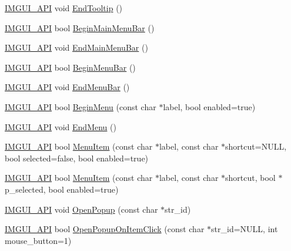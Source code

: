 \begin{DoxyCompactItemize}
\mbox{\hyperlink{imgui_8h_a43829975e84e45d1149597467a14bbf5}{I\+M\+G\+U\+I\+\_\+\+A\+PI}} void \mbox{\hyperlink{namespace_im_gui_ac8d75c160cfdf43d512f773ca133a1c6}{End\+Tooltip}} ()
\item 
\mbox{\hyperlink{imgui_8h_a43829975e84e45d1149597467a14bbf5}{I\+M\+G\+U\+I\+\_\+\+A\+PI}} bool \mbox{\hyperlink{namespace_im_gui_a55cb9cfb9865204ac6fb21c965784f78}{Begin\+Main\+Menu\+Bar}} ()
\item 
\mbox{\hyperlink{imgui_8h_a43829975e84e45d1149597467a14bbf5}{I\+M\+G\+U\+I\+\_\+\+A\+PI}} void \mbox{\hyperlink{namespace_im_gui_ab92f330c808546b340eb7bdf7e5f7c95}{End\+Main\+Menu\+Bar}} ()
\item 
\mbox{\hyperlink{imgui_8h_a43829975e84e45d1149597467a14bbf5}{I\+M\+G\+U\+I\+\_\+\+A\+PI}} bool \mbox{\hyperlink{namespace_im_gui_a4852dff802922163fc747e2e0df5b88f}{Begin\+Menu\+Bar}} ()
\item 
\mbox{\hyperlink{imgui_8h_a43829975e84e45d1149597467a14bbf5}{I\+M\+G\+U\+I\+\_\+\+A\+PI}} void \mbox{\hyperlink{namespace_im_gui_aa226265c140eb6ee375c5b9abc69c4fc}{End\+Menu\+Bar}} ()
\item 
\mbox{\hyperlink{imgui_8h_a43829975e84e45d1149597467a14bbf5}{I\+M\+G\+U\+I\+\_\+\+A\+PI}} bool \mbox{\hyperlink{namespace_im_gui_a1e55711a21f97d5dff919d697d3a7201}{Begin\+Menu}} (const char $\ast$label, bool enabled=true)
\item 
\mbox{\hyperlink{imgui_8h_a43829975e84e45d1149597467a14bbf5}{I\+M\+G\+U\+I\+\_\+\+A\+PI}} void \mbox{\hyperlink{namespace_im_gui_a1448a5a4e8c431c15f991e9255c0df95}{End\+Menu}} ()
\item 
\mbox{\hyperlink{imgui_8h_a43829975e84e45d1149597467a14bbf5}{I\+M\+G\+U\+I\+\_\+\+A\+PI}} bool \mbox{\hyperlink{namespace_im_gui_aa1bae511ca47478998693a9d8c84f2e6}{Menu\+Item}} (const char $\ast$label, const char $\ast$shortcut=N\+U\+LL, bool selected=false, bool enabled=true)
\item 
\mbox{\hyperlink{imgui_8h_a43829975e84e45d1149597467a14bbf5}{I\+M\+G\+U\+I\+\_\+\+A\+PI}} bool \mbox{\hyperlink{namespace_im_gui_a237e76bff3088f1c2622f4aebae2356e}{Menu\+Item}} (const char $\ast$label, const char $\ast$shortcut, bool $\ast$p\+\_\+selected, bool enabled=true)
\item 
\mbox{\hyperlink{imgui_8h_a43829975e84e45d1149597467a14bbf5}{I\+M\+G\+U\+I\+\_\+\+A\+PI}} void \mbox{\hyperlink{namespace_im_gui_a9576648c40b92f54b671e2e51654dd2c}{Open\+Popup}} (const char $\ast$str\+\_\+id)
\item 
\mbox{\hyperlink{imgui_8h_a43829975e84e45d1149597467a14bbf5}{I\+M\+G\+U\+I\+\_\+\+A\+PI}} bool \mbox{\hyperlink{namespace_im_gui_a546fc46d8f510cb17a2f272891e2f5b3}{Open\+Popup\+On\+Item\+Click}} (const char $\ast$str\+\_\+id=N\+U\+LL, int mouse\+\_\+button=1)

\end{DoxyCompactItemize}
